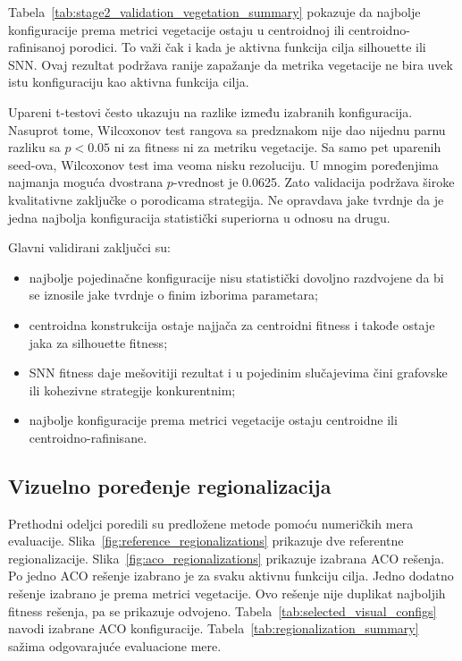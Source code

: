 \documentclass[11pt]{article}
\begin{document}
Tabela~\ref{tab:stage2_validation_vegetation_summary} pokazuje da najbolje konfiguracije prema metrici vegetacije ostaju u centroidnoj ili centroidno-rafinisanoj porodici. To važi čak i kada je aktivna funkcija cilja silhouette ili SNN. Ovaj rezultat podržava ranije zapažanje da metrika vegetacije ne bira uvek istu konfiguraciju kao aktivna funkcija cilja.

Upareni t-testovi često ukazuju na razlike između izabranih konfiguracija. Nasuprot tome, Wilcoxonov test rangova sa predznakom nije dao nijednu parnu razliku sa $p<0.05$ ni za fitness ni za metriku vegetacije. Sa samo pet uparenih seed-ova, Wilcoxonov test ima veoma nisku rezoluciju. U mnogim poređenjima najmanja moguća dvostrana $p$-vrednost je 0.0625. Zato validacija podržava široke kvalitativne zaključke o porodicama strategija. Ne opravdava jake tvrdnje da je jedna najbolja konfiguracija statistički superiorna u odnosu na drugu.

Glavni validirani zaključci su:
\begin{itemize}
  \item najbolje pojedinačne konfiguracije nisu statistički dovoljno razdvojene da bi se iznosile jake tvrdnje o finim izborima parametara;
  \item centroidna konstrukcija ostaje najjača za centroidni fitness i takođe ostaje jaka za silhouette fitness;
  \item SNN fitness daje mešovitiji rezultat i u pojedinim slučajevima čini grafovske ili kohezivne strategije konkurentnim;
  \item najbolje konfiguracije prema metrici vegetacije ostaju centroidne ili centroidno-rafinisane.
\end{itemize}

\subsection{Vizuelno poređenje regionalizacija}

Prethodni odeljci poredili su predložene metode pomoću numeričkih mera evaluacije. Slika~\ref{fig:reference_regionalizations} prikazuje dve referentne regionalizacije. Slika~\ref{fig:aco_regionalizations} prikazuje izabrana ACO rešenja. Po jedno ACO rešenje izabrano je za svaku aktivnu funkciju cilja. Jedno dodatno rešenje izabrano je prema metrici vegetacije. Ovo rešenje nije duplikat najboljih fitness rešenja, pa se prikazuje odvojeno. Tabela~\ref{tab:selected_visual_configs} navodi izabrane ACO konfiguracije. Tabela~\ref{tab:regionalization_summary} sažima odgovarajuće evaluacione mere.
\end{document}

